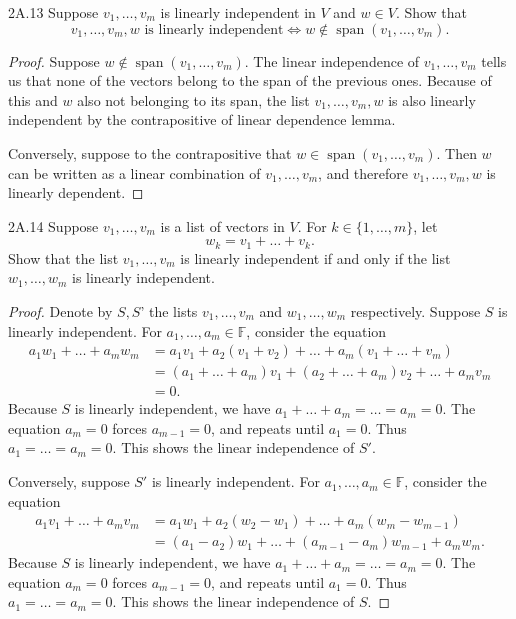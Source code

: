 \documentclass{exam}
\DeclareMathOperator{\spn}{span}
\begin{document}
\begin{problem}{2A.13}
    Suppose $v_1,\dots, v_m$ is linearly independent in $V$ and $w\in V$. Show that \[
        v_1,\dots,v_m,w\text{ is linearly independent}\iff w\notin\spn(v_1,\dots,v_m).
    \]
\end{problem}

\begin{proof}
    Suppose $w\notin\spn(v_1,\dots,v_m)$. The linear independence of $v_1, \dots, v_m$ tells us that none of the vectors belong to the span of the previous ones. Because of this and $w$ also not belonging to its span, the list $v_1,\dots,v_m, w$ is also linearly independent by the contrapositive of linear dependence lemma.

    Conversely, suppose to the contrapositive that $w\in\spn(v_1, \dots, v_m)$. Then $w$ can be written as a linear combination of $v_1,\dots, v_m$, and therefore $v_1, \dots, v_m, w$ is linearly dependent.
\end{proof}

\begin{problem}{2A.14}
    Suppose $v_1,\dots, v_m$ is a list of vectors in $V$. For $k\in\{1, \dots, m\}$, let \[
        w_k = v_1 + \dots + v_k.
    \]
    Show that the list $v_1,\dots,v_m$ is linearly independent if and only if the list $w_1,\dots,w_m$ is linearly independent.
\end{problem}

\begin{proof}
    Denote by $S, S$' the lists $v_1, \dots, v_m$ and $w_1, \dots, w_m$ respectively. Suppose $S$ is linearly independent. For $a_1, \dots, a_m\in\mathbb F$, consider the equation
    \begin{align*}
        a_1w_1 + \dots + a_mw_m &= a_1v_1 + a_2(v_1 + v_2) + \dots + a_m(v_1 + \dots + v_m)\\
        &= (a_1 + \dots + a_m)v_1 + (a_2 + \dots + a_m)v_2 + \dots + a_mv_m\\
        &= 0.
    \end{align*}
    Because $S$ is linearly independent, we have $a_1 + \dots + a_m = \dots = a_m = 0$. The equation $a_m = 0$ forces $a_{m-1} = 0$, and repeats until $a_1 = 0$. Thus $a_1 = \dots = a_m = 0$. This shows the linear independence of $S'$.

    Conversely, suppose $S'$ is linearly independent. For $a_1, \dots, a_m\in\mathbb F$, consider the equation
    \begin{align*}
        a_1v_1 + \dots + a_mv_m &= a_1w_1 + a_2(w_2 - w_1) + \dots + a_m(w_m - w_{m - 1})\\
        &= (a_1 - a_2)w_1 + \dots + (a_{m-1} - a_m)w_{m-1} + a_mw_m.
    \end{align*}
    Because $S$ is linearly independent, we have $a_1 + \dots + a_m = \dots = a_m = 0$. The equation $a_m = 0$ forces $a_{m-1} = 0$, and repeats until $a_1 = 0$. Thus $a_1 = \dots = a_m = 0$. This shows the linear independence of $S$.
\end{proof}
\end{document}
